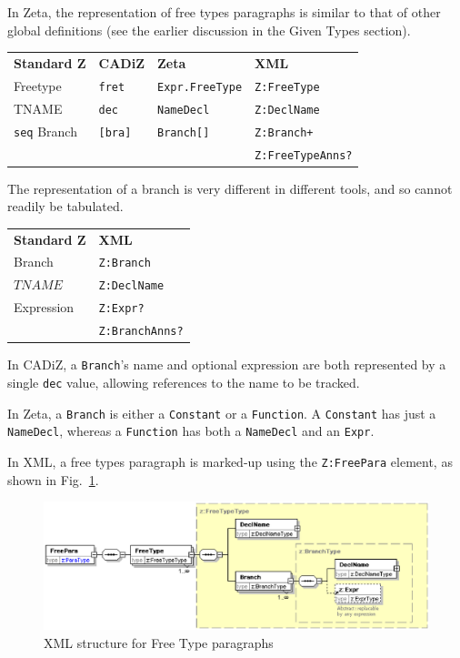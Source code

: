 \documentclass{llncs}  %
\newcommand{\AFont}[1]{\texttt{#1}}
\newcommand{\CADiZ}{CADiZ}
\newcommand{\Zeta}{Zeta}
\newcommand{\AExpression}{Expression}
\newcommand{\TNAME}{TNAME}
\newcommand{\CFreetype}{Freetype}
\newcommand{\CBranch}{Branch}
\begin{document}
In \Zeta, the representation of free types paragraphs is similar to that of
other global definitions (see the earlier discussion in the Given Types
section).

\begin{center}
\begin{tabular}{|l|l|l|l|}
\hline
{\bf Standard Z} & {\bf \CADiZ} & {\bf \Zeta} & {\bf XML}\\
\CFreetype & \AFont{fret} & \AFont{Expr.FreeType} & \AFont{Z:FreeType}\\
\hline
\TNAME & \AFont{dec} & \AFont{NameDecl} & \AFont{Z:DeclName}\\
\AFont{seq} \CBranch & \AFont{[bra]} & \AFont{Branch[]} & \AFont{Z:Branch+}\\
 & & & \AFont{Z:FreeTypeAnns?}\\
\hline
\end{tabular}
\end{center}

The representation of a branch is very different in different tools,
and so cannot readily be tabulated.

\begin{center}
\begin{tabular}{|l|l|}
\hline
{\bf Standard Z} & {\bf XML}\\
\CBranch & \AFont{Z:Branch}\\
\hline
$\TNAME$ & \AFont{Z:DeclName}\\
\AExpression & \AFont{Z:Expr?}\\
 & \AFont{Z:BranchAnns?}\\
\hline
\end{tabular}
\end{center}

In \CADiZ, a \AFont{Branch}'s name and optional expression
are both represented by a single \AFont{dec} value,
allowing references to the name to be tracked.

In \Zeta, a \AFont{Branch} is either a \AFont{Constant} or a \AFont{Function}.
A \AFont{Constant} has just a \AFont{NameDecl},
whereas a \AFont{Function} has both a \AFont{NameDecl} and an \AFont{Expr}.

In XML, a free types paragraph is marked-up using
the \AFont{Z:FreePara} element, as shown in Fig.~\ref{fig:freepara}.

\begin{figure}[htbp]
  \centering
  \includegraphics[width=\textwidth]{freepara.eps}
  \caption{XML structure for Free Type paragraphs}
  \label{fig:freepara}
\end{figure}
\end{document}
